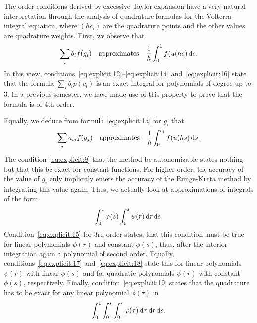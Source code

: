 \begin{remark}
  The order conditions derived by excessive Taylor expansion have a
  very natural interpretation through the analysis of quadrature
  formulas for the Volterra integral equation, where $(h c_i)$ are the
  quadrature points and the other values are quadrature weights.
  First, we observe that
  \begin{gather*}
    \sum_i b_i f(g_i) \quad\text{approximates}\quad
    \frac1h\int_0^1 f(u(h s)\,\mathrm{d} s.
  \end{gather*}
  In this view,
  conditions~\eqref{eq:explicit:12}--\eqref{eq:explicit:14}
  and~\eqref{eq:explicit:16} state that the formula $\sum_i b_i
  p(c_i)$ is an exact integral for polynomials of degree up to 3. In a
  previous semester, we have made use of this property to prove that
  the formula is of 4th order.

  Equally, we deduce from formula~\eqref{eq:explicit:1a} for $g_i$ that
  \begin{gather*}
    \sum_j a_{ij} f(g_j) \quad\text{approximates}\quad
    \frac1h\int_0^{c_i} f(u(h s)\,\mathrm{d} s.
  \end{gather*}
  The condition~\eqref{eq:explicit:9} that the method be autonomizable
  states nothing but that this be exact for constant functions. For
  higher order, the accuracy of the value of $g_i$ only implicitly
  enters the accuracy of the Runge-Kutta method by integrating this
  value again. Thus, we actually look at approximations of integrals
  of the form
  \begin{gather*}
    \int_0^1 \varphi(s) \int_0^s \psi(r) \,\mathrm{d} r\,\mathrm{d} s.
  \end{gather*}
  Condition~\eqref{eq:explicit:15} for 3rd order states, that this
  condition must be true for linear polynomials $\psi(r)$ and constant
  $\phi(s)$, thus, after the interior integration again a polynomial
  of second order. Equally, conditions~\eqref{eq:explicit:17}
  and~\eqref{eq:explicit:18} state this for linear polynomials
  $\psi(r)$ with linear $\phi(s)$ and for quadratic polynomials
  $\psi(r)$ with constant $\phi(s)$, respectively. Finally,
  condition~\eqref{eq:explicit:19} states that the quadrature has to
  be exact for any linear polynomial $\phi(\tau)$ in
  \begin{gather*}
    \int_0^1 \int_0^s \int_0^r \varphi(\tau) \,\mathrm{d} \tau\,\mathrm{d} r\,\mathrm{d} s.
  \end{gather*}
\end{remark}

